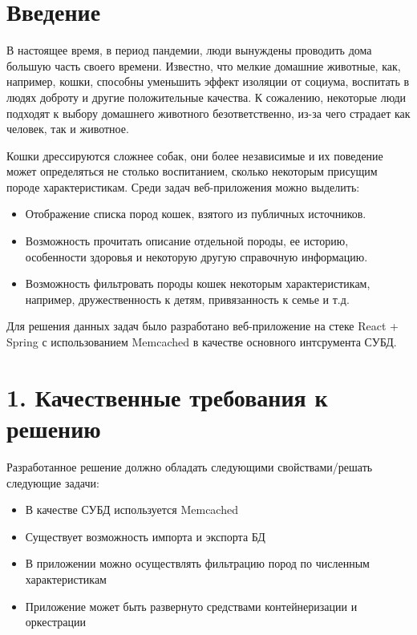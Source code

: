 \pagebreak

\section*{Введение}
В настоящее время, в период пандемии, люди вынуждены проводить
дома большую часть своего времени. Известно, что мелкие домашние
животные, как, например, кошки, способны уменьшить эффект
изоляции от социума, воспитать в людях доброту и другие положительные качества.
К сожалению, некоторые люди подходят к выбору домашнего животного безответственно,
из-за чего страдает как человек, так и животное.

Кошки дрессируются сложнее собак, они более независимые и их
поведение может определяться не столько воспитанием,
сколько некоторым присущим породе характеристикам.
Среди задач веб-приложения можно выделить:
\begin{itemize}
    \item Отображение списка пород кошек, взятого из публичных
    источников.
    \item Возможность прочитать описание отдельной породы, ее историю,
    особенности здоровья и некоторую другую справочную информацию.
    \item Возможность фильтровать породы кошек некоторым
    характеристикам, например, дружественность к детям, привязанность к семье и т.д.
\end{itemize}

Для решения данных задач было разработано веб-приложение на стеке
React + Spring с использованием Memcached в качестве основного интсрумента СУБД.

\pagebreak
{}
\section*{1. Качественные требования к решению}
Разработанное решение должно обладать следующими свойствами/решать следующие задачи:
\begin{itemize}
    \item В качестве СУБД используется Memcached
    \item Существует возможность импорта и экспорта БД
    \item В приложении можно осуществлять фильтрацию пород по численным характеристикам
    \item Приложение может быть развернуто средствами контейнеризации и оркестрации
\end{itemize}


